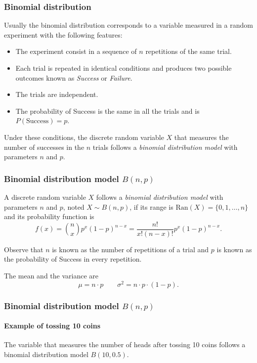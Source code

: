 \begin{frame}
\frametitle{Binomial distribution}
Usually the binomial distribution corresponds to a variable measured in a random experiment with the following features:
\begin{itemize}
\item The experiment consist in a sequence of $n$ repetitions of the same trial.
\item Each trial is repeated in identical conditions and produces two possible outcomes known as \emph{Success} or
\emph{Failure}.
\item The trials are independent.
\item The probability of Success is the same in all the trials and is $P(\mbox{Success})=p$.
\end{itemize}

Under these conditions, the discrete random variable $X$ that measures the number of successes in the $n$ trials follows a \emph{binomial distribution model} with parameters $n$ and $p$.
\end{frame}


\begin{frame}
\frametitle{Binomial distribution model $B(n,p)$}
\begin{definition}
A discrete random variable $X$ follows a \emph{binomial distribution model} with parameters $n$ and $p$, noted $X\sim B(n,p)$, if its range is $\mbox{Ran}(X) = \{0,1,\ldots,n\}$ and its probability function is
\[
f(x) = \binom{n}{x}p^x(1-p)^{n-x} = \frac{n!}{x!(n-x)!}p^x(1-p)^{n-x}.
\]
\end{definition}

Observe that $n$ is known as the number of repetitions of a trial and $p$ is known as the probability of Success in
every repetition. 

The mean and the variance are
\[
\mu = n\cdot p \qquad \sigma^2 = n\cdot p\cdot (1-p).
\]
\end{frame}


\begin{frame}
\frametitle{Binomial distribution model $B(n,p)$}
\framesubtitle{Example of tossing 10 coins}
The variable that measures the number of heads after tossing 10 coins follows a binomial distribution model $B(10,0.5)$.
\begin{center}
\end{center}
\end{frame}


